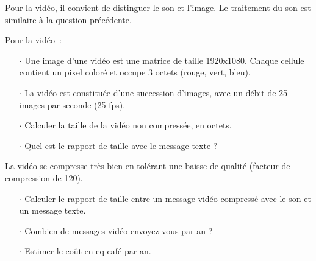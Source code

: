 



Pour la vidéo, il convient de distinguer le son et l'image. Le traitement du son est similaire à la question précédente.

Pour la vidéo~:

\begin{itemize}
\item[$\cdot$] Une image d'une vidéo est une matrice de taille 1920x1080. Chaque cellule contient un pixel coloré et occupe 3 octets (rouge, vert, bleu).
\item[$\cdot$] La vidéo est constituée d'une succession d'images, avec un débit de 25 images par seconde (25 fps).
\item[$\cdot$] Calculer la taille de la vidéo non compressée, en octets.
\item[$\cdot$] Quel est le rapport de taille avec le message texte ?
\end{itemize}

La vidéo se compresse très bien en tolérant une baisse de qualité  (facteur de compression de 120).

\begin{itemize}
\item[$\cdot$] Calculer le rapport de taille entre un message vidéo compressé avec le son et un message texte.
\item[$\cdot$] Combien de messages vidéo envoyez-vous par an ?
\item[$\cdot$] Estimer le coût en eq-café par an.
\end{itemize}


